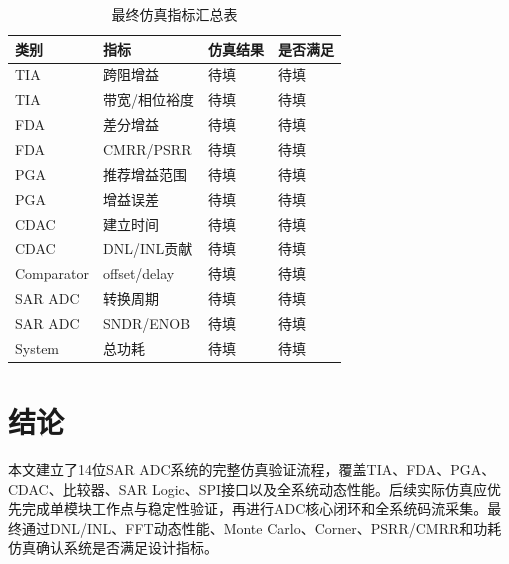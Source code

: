 \documentclass[12pt,a4paper]{ctexart}
\begin{document}
\begin{table}[H]
\centering
\caption{最终仿真指标汇总表}
\begin{tabular}{llll}
\toprule
类别 & 指标 & 仿真结果 & 是否满足 \\
\midrule
TIA & 跨阻增益 & 待填 & 待填 \\
TIA & 带宽/相位裕度 & 待填 & 待填 \\
FDA & 差分增益 & 待填 & 待填 \\
FDA & CMRR/PSRR & 待填 & 待填 \\
PGA & 推荐增益范围 & 待填 & 待填 \\
PGA & 增益误差 & 待填 & 待填 \\
CDAC & 建立时间 & 待填 & 待填 \\
CDAC & DNL/INL贡献 & 待填 & 待填 \\
Comparator & offset/delay & 待填 & 待填 \\
SAR ADC & 转换周期 & 待填 & 待填 \\
SAR ADC & SNDR/ENOB & 待填 & 待填 \\
System & 总功耗 & 待填 & 待填 \\
\bottomrule
\end{tabular}
\end{table}

\section{结论}

本文建立了14位SAR ADC系统的完整仿真验证流程，覆盖TIA、FDA、PGA、CDAC、比较器、SAR Logic、SPI接口以及全系统动态性能。后续实际仿真应优先完成单模块工作点与稳定性验证，再进行ADC核心闭环和全系统码流采集。最终通过DNL/INL、FFT动态性能、Monte Carlo、Corner、PSRR/CMRR和功耗仿真确认系统是否满足设计指标。
\end{document}
